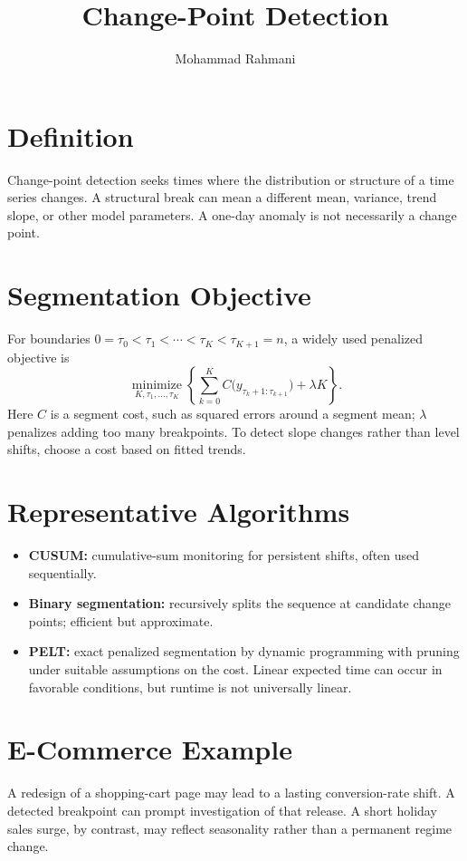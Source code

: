 \documentclass[a4paper]{article}
\title{Change-Point Detection}
\date{}
\author{Mohammad Rahmani}
\begin{document}
\maketitle

\section{Definition}
Change-point detection seeks times where the distribution or structure of a time series changes. A structural break can mean a different mean, variance, trend slope, or other model parameters. A one-day anomaly is not necessarily a change point.

\section{Segmentation Objective}
For boundaries $0=\tau_0<\tau_1<\cdots<\tau_K<\tau_{K+1}=n$, a widely used penalized objective is
\[
 \underset{K,\tau_1,\ldots,\tau_K}{\operatorname{minimize}}
 \left\{\sum_{k=0}^{K}
 C\bigl(y_{\tau_k+1:\tau_{k+1}}\bigr)
 +\lambda K\right\}.
\]
Here $C$ is a segment cost, such as squared errors around a segment mean; $\lambda$ penalizes adding too many breakpoints. To detect slope changes rather than level shifts, choose a cost based on fitted trends.

\section{Representative Algorithms}
\begin{itemize}
 \item \textbf{CUSUM:} cumulative-sum monitoring for persistent shifts, often used sequentially.
 \item \textbf{Binary segmentation:} recursively splits the sequence at candidate change points; efficient but approximate.
 \item \textbf{PELT:} exact penalized segmentation by dynamic programming with pruning under suitable assumptions on the cost. Linear expected time can occur in favorable conditions, but runtime is not universally linear.
\end{itemize}

\section{E-Commerce Example}
A redesign of a shopping-cart page may lead to a lasting conversion-rate shift. A detected breakpoint can prompt investigation of that release. A short holiday sales surge, by contrast, may reflect seasonality rather than a permanent regime change.
\end{document}
